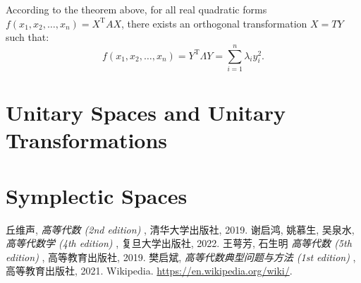 \documentclass[11pt]{../../TexTemplate/elegantbook} %
\begin{document}
\begin{note}
    According to the theorem above,
    for all real quadratic forms \( f(x_1, x_2, \dots, x_n) = X^{\mathrm{T}} A X \),
    there exists an orthogonal transformation \( X = T Y \) such that:
    \[
    f(x_1, x_2, \dots, x_n) = Y^{\mathrm{T}} \Lambda Y = \sum_{i=1}^{n} \lambda_i y_i^2.
    \]
\end{note}

\section{Unitary Spaces and Unitary Transformations}

\section{Symplectic Spaces}

\begin{thebibliography}{99} 
 丘维声, \emph{ 高等代数 (2nd edition) }, 清华大学出版社, 2019. 
 谢启鸿, 姚慕生, 吴泉水, \emph{ 高等代数学 (4th edition) }, 复旦大学出版社, 2022.
 王萼芳, 石生明 \emph{ 高等代数 (5th edition) }, 高等教育出版社, 2019.
 樊启斌, \emph{ 高等代数典型问题与方法 (1st edition) }, 高等教育出版社, 2021.
 Wikipedia. \url{https://en.wikipedia.org/wiki/}.
\end{thebibliography}
\end{document}
